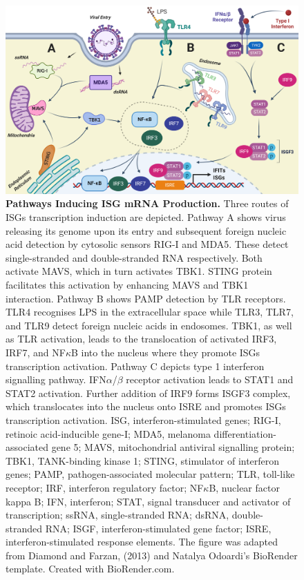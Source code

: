 \begin{figure}
    \centering
    \includegraphics[width=1\linewidth]{04. Introduction//Figs/01. IFIT transcription activation figure.png}
    \caption[Pathways Inducing ISG mRNA Production.]{\textbf{Pathways Inducing ISG mRNA Production.} Three routes of ISGs transcription induction are depicted. Pathway A shows virus releasing its genome upon its entry and subsequent foreign nucleic acid detection by cytosolic sensors RIG-I and MDA5. These detect single-stranded and double-stranded RNA respectively. Both activate MAVS, which in turn activates TBK1. STING protein facilitates this activation by enhancing MAVS and TBK1 interaction. Pathway B shows PAMP detection by TLR receptors. TLR4 recognises LPS in the extracellular space while TLR3, TLR7, and TLR9 detect foreign nucleic acids in endosomes. TBK1, as well as TLR activation, leads to the translocation of activated IRF3, IRF7, and NF\(\kappa\)B into the nucleus where they promote ISGs transcription activation. Pathway C depicts type 1 interferon signalling pathway. IFN\(\alpha\)/\(\beta\) receptor activation leads to STAT1 and STAT2 activation. Further addition of IRF9 forms ISGF3 complex, which translocates into the nucleus onto ISRE and promotes ISGs transcription activation. ISG, interferon-stimulated genes; RIG-I, retinoic acid-inducible gene-I; MDA5, melanoma differentiation-associated gene 5; MAVS, mitochondrial antiviral signalling protein; TBK1, TANK-binding kinase 1; STING, stimulator of interferon genes; PAMP, pathogen-associated molecular pattern; TLR, toll-like receptor; IRF, interferon regulatory factor; NF\(\kappa\)B, nuclear factor kappa B; IFN, interferon; STAT, signal transducer and activator of transcription; ssRNA, single-stranded RNA; dsRNA, double-stranded RNA; ISGF, interferon-stimulated gene factor; ISRE, interferon-stimulated response elements. The figure was adapted from Diamond and Farzan, (2013) and Natalya Odoardi's BioRender template. Created with BioRender.com.}
    \label{fig:Pathways Inducing ISG mRNA Production.}
\end{figure}

